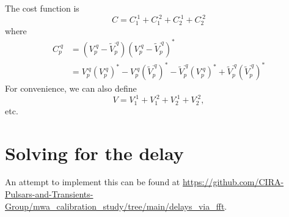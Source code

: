 \documentclass{book}
\begin{document}
The cost function is
\begin{equation}
    C = C_1^{\cdot 1} + C_1^{\cdot 2} + C_2^{\cdot 1} + C_2^{\cdot 2}
\end{equation}
where
\begin{equation}
\begin{aligned}
    C_p^{\cdot q}
        &= (V_p^{\cdot q} - \tilde{V}_p^{\cdot q})(V_p^{\cdot q} - \tilde{V}_p^{\cdot q})^\ast \\
        &= V_p^{\cdot q} (V_p^{\cdot q})^\ast - V_p^{\cdot q} (\tilde{V}_p^{\cdot q})^\ast -
           \tilde{V}_p^{\cdot q}(V_p^{\cdot q})^\ast + \tilde{V}_p^{\cdot q}(\tilde{V}_p^{\cdot q})^\ast
\end{aligned}
\end{equation}
For convenience, we can also define
\begin{equation}
    V = V_1^{\cdot 1} + V_1^{\cdot 2} + V_2^{\cdot 1} + V_2^{\cdot 2},
\end{equation}
etc.

\section{Solving for the delay}

An attempt to implement this can be found at \url{https://github.com/CIRA-Pulsars-and-Transients-Group/mwa_calibration_study/tree/main/delays_via_fft}.
\end{document}

